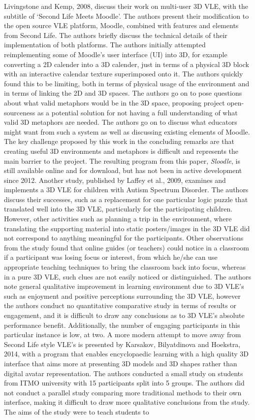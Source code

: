 \documentclass[11pt]{report}
\begin{document}
Livingstone and Kemp, 2008, discuss their work on multi-user 3D VLE, with the subtitle of `Second Life Meets Moodle'. The authors present their modification to the open source VLE platform, Moodle, combined with features and elements from Second Life. The authors briefly discuss the technical details of their implementation of both platforms. The authors initially attempted reimplementing some of Moodle's user interface (UI) into 3D, for example converting a 2D calender into a 3D calender, just in terms of a physical 3D block with an interactive calendar texture superimposed onto it. The authors quickly found this to be limiting, both in terms of physical usage of the environment and in terms of linking the 2D and 3D spaces. The authors go on to pose questions about what valid metaphors would be in the 3D space, proposing project open-sourceness as a potential solution for not having a full understanding of what valid 3D metaphors are needed. The authors go on to discuss what educators might want from such a system as well as discussing existing elements of Moodle. The key challenge proposed by this work in the concluding remarks are that creating useful 3D environments and metaphors is difficult and represents the main barrier to the project. The resulting program from this paper, \textit{Sloodle}, is still available online and for download, but has not been in active development since 2012. Another study, published by Laffey et al., 2009, examines and implements a 3D VLE for children with Autism Spectrum Disorder. The authors discuss their successes, such as a replacement for one particular logic puzzle that translated well into the 3D VLE, particularly for the participating children. However, other activities such as planning a trip in the environment, where translating the supporting material into static posters/images in the 3D VLE did not correspond to anything meaningful for the participants. Other observations from the study found that online guides (or teachers) could notice in a classroom if a participant was losing focus or interest, from which he/she can use appropriate teaching techniques to bring the classroom back into focus, whereas in a pure 3D VLE, such clues are not easily noticed or distinguished. The authors note general qualitative improvement in learning environment due to 3D VLE's such as enjoyment and positive perceptions surrounding the 3D VLE, however the authors conduct no quantitative comparative study in terms of results or engagement, and it is difficult to draw any conclusions as to 3D VLE's absolute performance benefit. Additionally, the number of engaging participants in this particular instance is low, at two. A more modern attempt to move away from Second Life style VLE's is presented by Karsakov, Bilyatdinova and Hoekstra, 2014, with a program that enables encyclopaedic learning with a high quality 3D interface that aims more at presenting 3D models and 3D shapes rather than digital avatar representation. The authors conducted a small study on students from ITMO university with 15 participants split into 5 groups. The authors did not conduct a parallel study comparing more traditional methods to their own interface, making it difficult to draw more qualitative conclusions from the study. The aims of the study were to teach students to 
\end{document}
